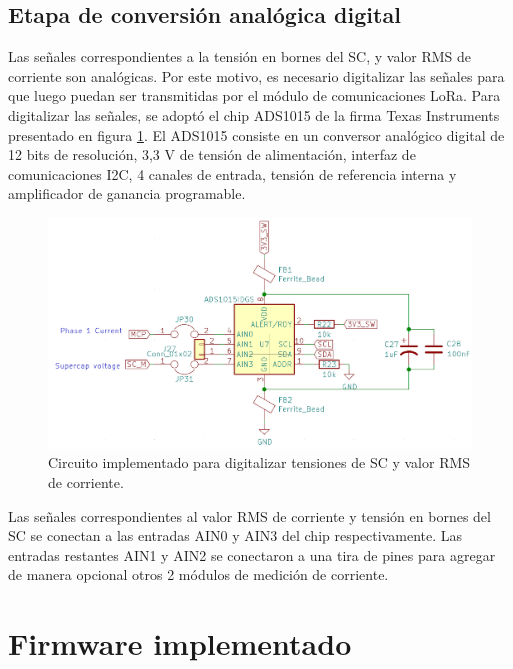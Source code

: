 \subsection{Etapa de conversión analógica digital}
Las señales correspondientes a la tensión en bornes del SC, y valor RMS de corriente son analógicas. Por este motivo, es necesario digitalizar las señales para que luego puedan ser transmitidas por el módulo de comunicaciones LoRa. Para digitalizar las señales, se adoptó el chip ADS1015 de la firma Texas Instruments presentado en figura \ref{fig:ctoadc}. El ADS1015 consiste en un conversor analógico digital de 12 bits de resolución, 3,3 V de tensión de alimentación, interfaz de comunicaciones I2C, 4 canales de entrada, tensión de referencia interna y amplificador de ganancia programable.\\
\begin{figure}[h!]
	\centering
	\includegraphics[width=0.7\linewidth]{Figures/cto_adc}
	\caption{Circuito implementado para digitalizar tensiones de SC y valor RMS de corriente.}
	\label{fig:ctoadc}
\end{figure}
Las señales correspondientes al valor RMS de corriente y tensión en bornes del SC se conectan a las entradas AIN0 y AIN3 del chip respectivamente. Las entradas restantes AIN1 y AIN2 se conectaron a una tira de pines para agregar de manera opcional otros 2 módulos de medición de corriente.\\


\section{Firmware implementado}
\label{seccion_firmware}
